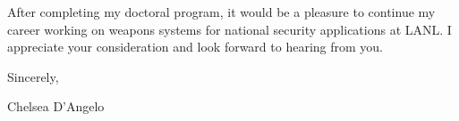 \begin{center}
\begin{minipage}{\textwidth}
\begin{itemize}[leftmargin=.875in,rightmargin=.875in,itemsep=1.0mm]
\end{itemize} 

\vspace{5mm} %


\vspace{2mm}

After completing my doctoral program, it would be a pleasure 
to continue my career working on weapons systems for
national security applications at LANL.  
I appreciate your consideration and look forward to hearing from you. 
  \vspace{6mm}
  
  Sincerely, \\ \vspace{-4mm}
  
  
  Chelsea D'Angelo
  
  \endgroup
  
  \end{minipage}
\end{center}
